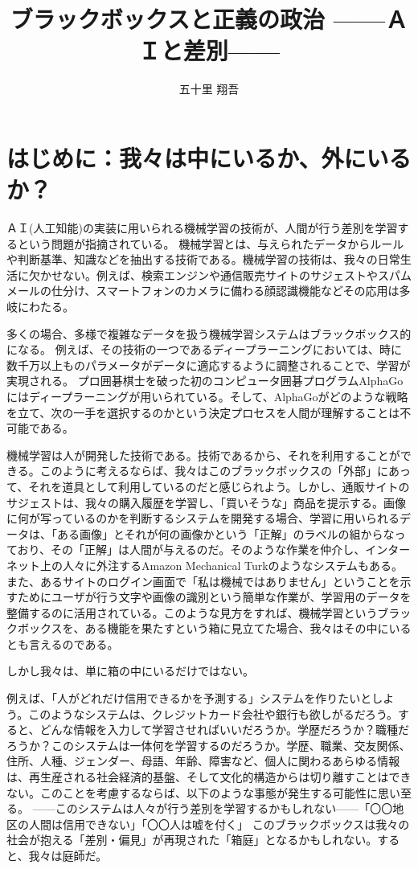 \documentclass[b5j,twoside,twocolumn]{utarticle}
\title{ブラックボックスと正義の政治 ------ＡＩと差別------}
\author{五十里 翔吾}
\date{\vspace{-5mm}}
\begin{document}
\let\footnote=\endnote
\maketitle
\thispagestyle{myheadings}
\section{はじめに：我々は中にいるか、外にいるか？}
ＡＩ(人工知能)の実装に用いられる機械学習の技術が、人間が行う差別を学習するという問題が指摘されている。
機械学習とは、与えられたデータからルールや判断基準、知識などを抽出する技術である。機械学習の技術は、我々の日常生活に欠かせない。例えば、検索エンジンや通信販売サイトのサジェストやスパムメールの仕分け、スマートフォンのカメラに備わる顔認識機能などその応用は多岐にわたる。


多くの場合、多様で複雑なデータを扱う機械学習システムはブラックボックス的になる。
例えば、その技術の一つであるディープラーニングにおいては、時に数千万以上ものパラメータがデータに適応するように調整されることで、学習が実現される。
プロ囲碁棋士を破った初のコンピュータ囲碁プログラムAlphaGoにはディープラーニングが用いられている。そして、AlphaGoがどのような戦略を立て、次の一手を選択するのかという決定プロセスを人間が理解することは不可能である。


機械学習は人が開発した技術である。技術であるから、それを利用することができる。このように考えるならば、我々はこのブラックボックスの「外部」にあって、それを道具として利用しているのだと感じられよう。しかし、通販サイトのサジェストは、我々の購入履歴を学習し、「買いそうな」商品を提示する。画像に何が写っているのかを判断するシステムを開発する場合、学習に用いられるデータは、「ある画像」とそれが何の画像かという「正解」のラベルの組からなっており、その「正解」は人間が与えるのだ。そのような作業を仲介し、インターネット上の人々に外注するAmazon Mechanical Turkのようなシステムもある。また、あるサイトのログイン画面で「私は機械ではありません」ということを示すためにユーザが行う文字や画像の識別という簡単な作業が、学習用のデータを整備するのに活用されている。このような見方をすれば、機械学習というブラックボックスを、ある機能を果たすという箱に見立てた場合、我々はその中にいるとも言えるのである。


しかし我々は、単に箱の中にいるだけではない。


例えば、「人がどれだけ信用できるかを予測する」システムを作りたいとしよう。このようなシステムは、クレジットカード会社や銀行も欲しがるだろう。すると、どんな情報を入力して学習させればいいだろうか。学歴だろうか？職種だろうか？このシステムは一体何を学習するのだろうか。学歴、職業、交友関係、住所、人種、ジェンダー、母語、年齢、障害など、個人に関わるあらゆる情報は、再生産される社会経済的基盤、そして文化的構造からは切り離すことはできない。このことを考慮するならば、以下のような事態が発生する可能性に思い至る。
------このシステムは人々が行う差別を学習するかもしれない------「〇〇地区の人間は信用できない」「〇〇人は嘘を付く」
このブラックボックスは我々の社会が抱える「差別・偏見」が再現された「箱庭」となるかもしれない。すると、我々は庭師だ。
\end{document}
